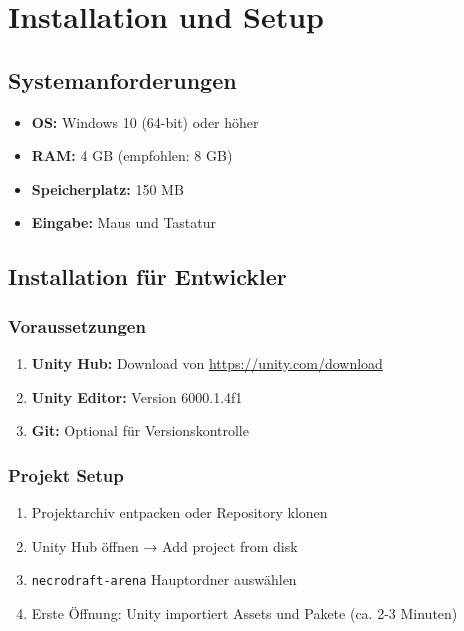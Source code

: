 \chapter{Installation und Setup}
\label{chap:installation}

\section{Systemanforderungen}

\begin{itemize}
    \item \textbf{OS:} Windows 10 (64-bit) oder höher
    \item \textbf{RAM:} 4 GB (empfohlen: 8 GB)
    \item \textbf{Speicherplatz:} 150 MB
    \item \textbf{Eingabe:} Maus und Tastatur
\end{itemize}

\section{Installation für Entwickler}

\subsection{Voraussetzungen}
\begin{enumerate}
    \item \textbf{Unity Hub:} Download von \url{https://unity.com/download}
    \item \textbf{Unity Editor:} Version 6000.1.4f1
    \item \textbf{Git:} Optional für Versionskontrolle
\end{enumerate}

\subsection{Projekt Setup}
\begin{enumerate}
    \item Projektarchiv entpacken oder Repository klonen
    \item Unity Hub öffnen → Add project from disk
    \item \texttt{necrodraft-arena} Hauptordner auswählen
    \item Erste Öffnung: Unity importiert Assets und Pakete (ca. 2-3 Minuten)
\end{enumerate}

